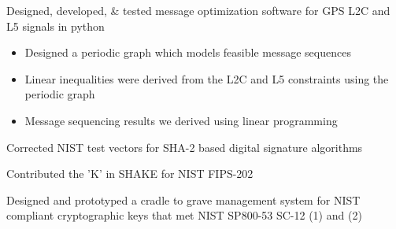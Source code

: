 \documentclass[letterpaper]{clinton-resume}
\begin{document}
\begin{minipage}[t]{0.66\textwidth}
\begin{tightitemize}
\item Designed, developed, \& tested message optimization software for GPS L2C and L5 signals in python
\begin{itemize}
\item Designed a periodic graph which models feasible message sequences
\item Linear inequalities were derived from the L2C and L5 constraints using the periodic graph
\item Message sequencing results we derived using linear programming
\end{itemize}
\item Corrected NIST test vectors for SHA-2 based digital signature algorithms
\item Contributed the 'K' in SHAKE for NIST FIPS-202
\item Designed and prototyped a cradle to grave management system for NIST compliant cryptographic keys that met NIST SP800-53 SC-12 (1) and (2)
\end{tightitemize}
\sectionspace




\end{minipage}
\newpage
\begin{minipage}[t]{0.33\textwidth}
\hspace{0.33\textwidth}
\end{minipage}
\end{document}
